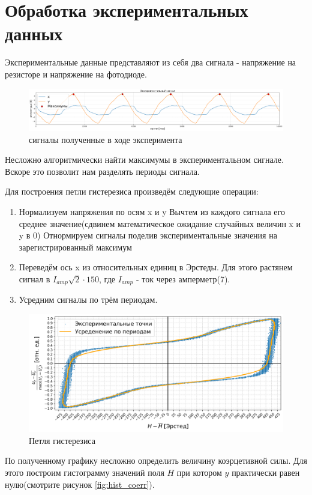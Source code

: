 \documentclass[a4paper, 12pt]{extarticle}
\begin{document}
\section*{\textcolor{header}{Обработка экспериментальных данных}}

Экспериментальные данные представляют из себя два сигнала - напряжение на резисторе и напряжение на фотодиоде.
\begin{figure}[htbp]
    \centering
    \includegraphics[width = 1\textwidth]{raw_signals.png}
    \caption{сигналы полученные в ходе эксперимента}
    \label{fig:raw_signals}
\end{figure}

Несложно алгоритмически найти максимумы в экспериментальном сигнале.
Вскоре это позволит нам разделять периоды сигнала.

Для построения петли гистерезиса произведём следующие операции:
\begin{enumerate}
    \item Нормализуем напряжения по осям x и y
        \subitem Вычтем из каждого сигнала его среднее значение(сдвинем математическое ожидание случайных величин x и y в 0)
        \subitem Отнормируем сигналы поделив экспериментальные значения на зарегистрированный максимум 
    \item Переведём ось x из относительных единиц в Эрстеды. Для этого растянем сигнал в $I_{amp} \sqrt{2} \cdot 150$, где $I_{amp}$ - ток через амперметр(7).
    \item Усредним сигналы по трём периодам.
\end{enumerate}

\begin{figure}[htbp]
    \centering
    \includegraphics[width = 1 \textwidth]{main.png}
    \caption{Петля гистерезиса}
    \label{fig:main}
\end{figure}
По полученному графику несложно определить величину коэрцетивной силы. Для этого построим гистограмму
значений поля $H$ при котором $y$ практически равен нулю(смотрите рисунок \ref{fig:hist_coerr}).
\end{document}
